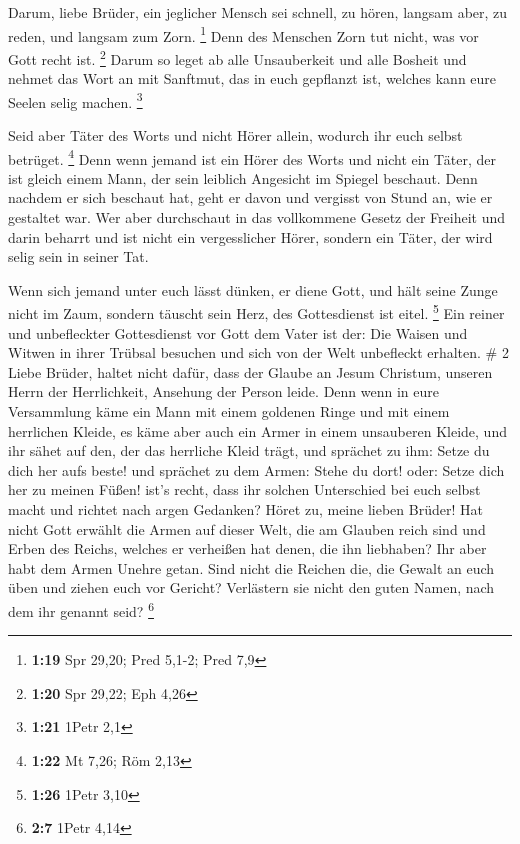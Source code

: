  Darum, liebe Brüder, ein jeglicher Mensch sei schnell, zu
hören, langsam aber, zu reden, und langsam zum Zorn. \footnote{\textbf{1:19}
  Spr 29,20; Pred 5,1-2; Pred 7,9}  Denn des Menschen Zorn
tut nicht, was vor Gott recht ist. \footnote{\textbf{1:20} Spr 29,22;
  Eph 4,26}  Darum so leget ab alle Unsauberkeit und alle
Bosheit und nehmet das Wort an mit Sanftmut, das in euch gepflanzt ist,
welches kann eure Seelen selig machen. \footnote{\textbf{1:21} 1Petr 2,1}

 Seid aber Täter des Worts und nicht Hörer allein, wodurch
ihr euch selbst betrüget. \footnote{\textbf{1:22} Mt 7,26; Röm 2,13}
 Denn wenn jemand ist ein Hörer des Worts und nicht ein
Täter, der ist gleich einem Mann, der sein leiblich Angesicht im Spiegel
beschaut.  Denn nachdem er sich beschaut hat, geht er davon
und vergisst von Stund an, wie er gestaltet war.  Wer aber
durchschaut in das vollkommene Gesetz der Freiheit und darin beharrt und
ist nicht ein vergesslicher Hörer, sondern ein Täter, der wird selig
sein in seiner Tat.

 Wenn sich jemand unter euch lässt dünken, er diene Gott,
und hält seine Zunge nicht im Zaum, sondern täuscht sein Herz, des
Gottesdienst ist eitel. \footnote{\textbf{1:26} 1Petr 3,10}
 Ein reiner und unbefleckter Gottesdienst vor Gott dem
Vater ist der: Die Waisen und Witwen in ihrer Trübsal besuchen und sich
von der Welt unbefleckt erhalten. \# 2  Liebe Brüder, haltet
nicht dafür, dass der Glaube an Jesum Christum, unseren Herrn der
Herrlichkeit, Ansehung der Person leide.  Denn wenn in eure
Versammlung käme ein Mann mit einem goldenen Ringe und mit einem
herrlichen Kleide, es käme aber auch ein Armer in einem unsauberen
Kleide,  und ihr sähet auf den, der das herrliche Kleid
trägt, und sprächet zu ihm: Setze du dich her aufs beste! und sprächet
zu dem Armen: Stehe du dort! oder: Setze dich her zu meinen Füßen!
 ist's recht, dass ihr solchen Unterschied bei euch selbst
macht und richtet nach argen Gedanken?  Höret zu, meine
lieben Brüder! Hat nicht Gott erwählt die Armen auf dieser Welt, die am
Glauben reich sind und Erben des Reichs, welches er verheißen hat denen,
die ihn liebhaben?  Ihr aber habt dem Armen Unehre getan.
Sind nicht die Reichen die, die Gewalt an euch üben und ziehen euch vor
Gericht?  Verlästern sie nicht den guten Namen, nach dem ihr
genannt seid? \footnote{\textbf{2:7} 1Petr 4,14}

